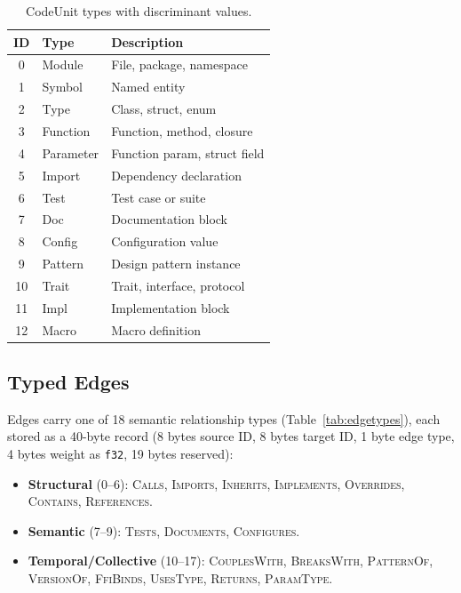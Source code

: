 \documentclass[10pt, twocolumn]{article}
\begin{document}
\begin{table}[t]
\caption{CodeUnit types with discriminant values.}
\label{tab:unittypes}
\centering
\scriptsize
\begin{tabular}{@{}clp{3.2cm}@{}}
\toprule
\textbf{ID} & \textbf{Type} & \textbf{Description} \\
\midrule
0  & Module    & File, package, namespace \\
1  & Symbol    & Named entity \\
2  & Type      & Class, struct, enum \\
3  & Function  & Function, method, closure \\
4  & Parameter & Function param, struct field \\
5  & Import    & Dependency declaration \\
6  & Test      & Test case or suite \\
7  & Doc       & Documentation block \\
8  & Config    & Configuration value \\
9  & Pattern   & Design pattern instance \\
10 & Trait     & Trait, interface, protocol \\
11 & Impl      & Implementation block \\
12 & Macro     & Macro definition \\
\bottomrule
\end{tabular}
\end{table}


\subsection{Typed Edges}
\label{sec:edges}

Edges carry one of 18 semantic relationship types (Table~\ref{tab:edgetypes}), each stored as a 40-byte record (8 bytes source ID, 8 bytes target ID, 1 byte edge type, 4 bytes weight as \texttt{f32}, 19 bytes reserved):

\begin{itemize}[nosep, leftmargin=*]
  \item \textbf{Structural} (0--6): \textsc{Calls}, \textsc{Imports}, \textsc{Inherits}, \textsc{Implements}, \textsc{Overrides}, \textsc{Contains}, \textsc{References}.
  \item \textbf{Semantic} (7--9): \textsc{Tests}, \textsc{Documents}, \textsc{Configures}.
  \item \textbf{Temporal/Collective} (10--17): \textsc{CouplesWith}, \textsc{BreaksWith}, \textsc{PatternOf}, \textsc{VersionOf}, \textsc{FfiBinds}, \textsc{UsesType}, \textsc{Returns}, \textsc{ParamType}.
\end{itemize}
\end{document}
